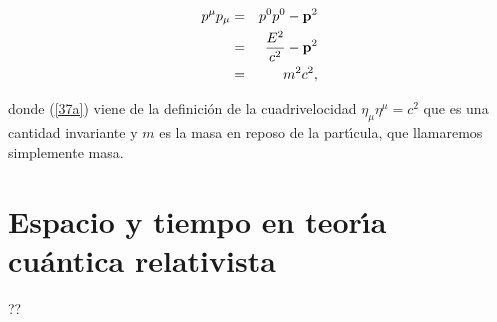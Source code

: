 \begin{eqnarray}
p^{\mu }p_{\mu } &=&p^{0}p^{0}-\mathbf{p}^{2}  \notag \\
&=&\frac{E^{2}}{c^{2}}-\mathbf{p}^{2}  \notag \\
&=&m^{2}c^{2}  \label{37a},
\end{eqnarray}%

donde (\ref{37a}) viene de la definici\'{o}n de la cuadrivelocidad $\eta
_{\mu }\eta ^{\mu }=c^{2}$ que es una cantidad invariante y $m$ es la masa
en reposo de la part\'{\i}cula, que llamaremos simplemente masa.

\section{Espacio y tiempo en teor\'{\i}a cu\'{a}ntica relativista}

??

